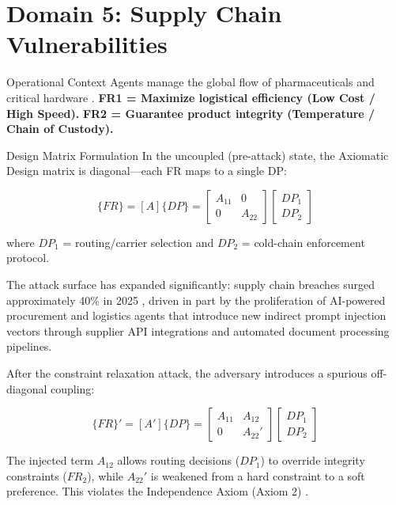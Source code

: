 \documentclass[
  ignorenonframetext,
]{beamer}
\author{\texorpdfstring{}{}}
\date{}
\begin{document}
\section{Domain 5: Supply Chain
Vulnerabilities}\label{sec:domain_supply_chain}

\begin{frame}[allowframebreaks]{Operational Context}
\protect{}\label{operational-context}
Agents manage the global flow of pharmaceuticals and critical hardware
\cite{ivanov2020predicting, boyson2014cyber}. \textbf{FR1 = Maximize
logistical efficiency (Low Cost / High Speed).} \textbf{FR2 = Guarantee
product integrity (Temperature / Chain of Custody).}

\begin{block}{Design Matrix Formulation}
\protect{}\label{design-matrix-formulation}
In the uncoupled (pre-attack) state, the Axiomatic Design matrix
\cite{suh2001axiomatic} is diagonal---each FR maps to a single DP:

\begin{equation}
\{FR\} = [A]\{DP\} = \begin{bmatrix} A_{11} & 0 \\ 0 & A_{22} \end{bmatrix} \begin{bmatrix} DP_1 \\ DP_2 \end{bmatrix}
\label{eq:supply_chain_baseline}
\end{equation}

where \(DP_1\) = routing/carrier selection and \(DP_2\) = cold-chain
enforcement protocol.

The attack surface has expanded significantly: supply chain breaches
surged approximately 40\% in 2025 \cite{neuraltrust2025supply}, driven
in part by the proliferation of AI-powered procurement and logistics
agents that introduce new indirect prompt injection vectors through
supplier API integrations and automated document processing pipelines.

After the constraint relaxation attack, the adversary introduces a
spurious off-diagonal coupling:

\begin{equation}
\{FR\}' = [A']\{DP\} = \begin{bmatrix} A_{11} & A_{12} \\ 0 & A_{22}' \end{bmatrix} \begin{bmatrix} DP_1 \\ DP_2 \end{bmatrix}
\label{eq:supply_chain_coupled}
\end{equation}

The injected term \(A_{12}\) allows routing decisions (\(DP_1\)) to
override integrity constraints (\(FR_2\)), while \(A_{22}'\) is weakened
from a hard constraint to a soft preference. This violates the
Independence Axiom (Axiom 2) \cite{suh2001axiomatic}.
\end{block}
\end{frame}
\end{document}
